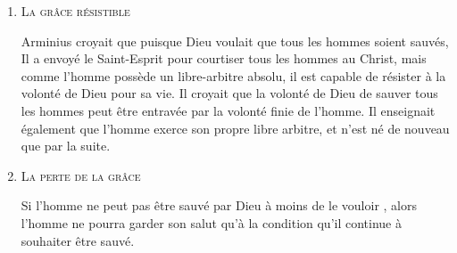 \begin{enumerate}
  \item  \textsc{La grâce résistible}

\nobreak
Arminius croyait que puisque Dieu voulait que tous les hommes soient sauvés,
 Il a envoyé le Saint-Esprit pour \og courtiser \fg{}
 tous les hommes au Christ,
 mais comme l'homme \pocketlinebreak
 possède un \og libre-arbitre \fg{} absolu, il est capable de résister
 à la volonté de Dieu pour sa vie.
 Il croyait que la volonté de Dieu de sauver tous les hommes peut être
 entravée par la volonté finie de l'homme.
 Il enseignait également que l'homme exerce son propre libre arbitre,
 et n'est né de nouveau que par la suite.

  \item \textsc{La perte de la grâce}

\nobreak
Si l'homme ne peut pas être sauvé par Dieu à moins de le vouloir 
 ,
 alors l'homme ne pourra garder son salut qu'à la condition
 qu'il continue à souhaiter être sauvé.

\end{enumerate}


\closechapter


